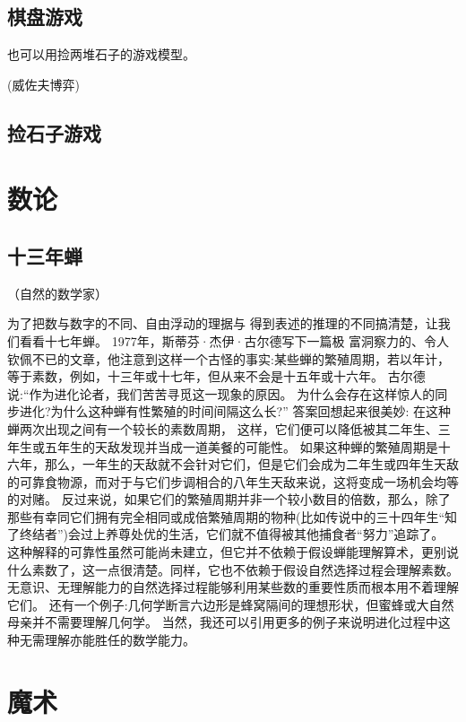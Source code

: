 \documentclass[12pt, letterpaper]{ctexrep}
\begin{document}
\section{棋盘游戏}
也可以用捡两堆石子的游戏模型。

(威佐夫博弈)


\section{捡石子游戏}




\chapter{数论}


\section{十三年蝉}
（自然的数学家）

为了把数与数字的不同、自由浮动的理据与 得到表述的推理的不同搞清楚，让我们看看十七年蝉。
1977年，斯蒂芬·杰伊·古尔德写下一篇极 富洞察力的、令人钦佩不已的文章，他注意到这样一个古怪的事实:某些蝉的繁殖周期，若以年计，等于素数，例如，十三年或十七年，但从来不会是十五年或十六年。
古尔德说:“作为进化论者，我们苦苦寻觅这一现象的原因。
为什么会存在这样惊人的同步进化?为什么这种蝉有性繁殖的时间间隔这么长?”
答案回想起来很美妙: 在这种蝉两次出现之间有一个较长的素数周期， 这样，它们便可以降低被其二年生、三年生或五年生的天敌发现并当成一道美餐的可能性。
如果这种蝉的繁殖周期是十六年，那么，一年生的天敌就不会针对它们，但是它们会成为二年生或四年生天敌的可靠食物源，而对于与它们步调相合的八年生天敌来说，这将变成一场机会均等的对赌。
反过来说，如果它们的繁殖周期并非一个较小数目的倍数，那么，除了那些有幸同它们拥有完全相同或成倍繁殖周期的物种(比如传说中的三十四年生“知了终结者”)会过上养尊处优的生活，它们就不值得被其他捕食者“努力”追踪了。
这种解释的可靠性虽然可能尚未建立，但它并不依赖于假设蝉能理解算术，更别说什么素数了，这一点很清楚。同样，它也不依赖于假设自然选择过程会理解素数。
无意识、无理解能力的自然选择过程能够利用某些数的重要性质而根本用不着理解它们。
还有一个例子:几何学断言六边形是蜂窝隔间的理想形状，但蜜蜂或大自然母亲并不需要理解几何学。
当然，我还可以引用更多的例子来说明进化过程中这种无需理解亦能胜任的数学能力。




\chapter{魔术}
\end{document}

